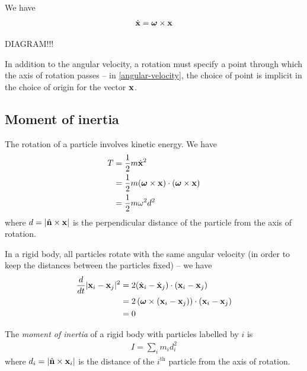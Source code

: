 \documentclass{../template/note}
\begin{document}
    \begin{proposition}
        \label{angular-velocity} We have
        \begin{align*}
            \dot{\V x} = \V \omega \times \V x
        \end{align*}
    \end{proposition}
    
    DIAGRAM!!!

    In addition to the angular velocity, a rotation must specify a point through which the axis of rotation passes -- in \cref{angular-velocity}, the choice of point is implicit in the choice of origin for the vector \(\V x\).


    \subsection{Moment of inertia}

    The rotation of a particle involves kinetic energy. We have
    \begin{align*}
        T &= \frac 1 2 m \dot{\V x}^2 \\
        &= \frac 1 2 m (\V \omega \times \V x) \cdot (\V \omega \times \V x) \\
        &= \frac 1 2 m \omega^2 d^2
    \end{align*}
    where \(d = |\hvec n \times \V x|\) is the perpendicular distance of the particle from the axis of rotation.

    In a rigid body, all particles rotate with the same angular velocity (in order to keep the distances between the particles fixed) -- we have
    \begin{align*}
        \frac d {dt} |\V x_i - \V x_j|^2 &= 2(\dot{\V x}_i - \dot{\V x}_j) \cdot (\V x_i - \V x_j) \\
        &= 2\left(\V \omega \times (\V x_i - \V x_j)\right) \cdot (\V x_i - \V x_j) \\
        &= 0
    \end{align*}

    \begin{definition}
        The \emph{moment of inertia} of a rigid body with particles labelled by \(i\) is
        \begin{align*}
            I = \sum_i m_i d_i^2
        \end{align*}
        where \(d_i = |\hvec n \times \V x_i|\) is the distance of the \(i^\text{th}\) particle from the axis of rotation.        
    \end{definition}
    
\end{document}
